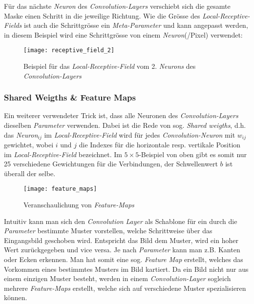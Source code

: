 Für das nächste \textit{Neuron} des \textit{Convolution-Layers} verschiebt sich die gesamte Maske einen Schritt in die jeweilige Richtung. Wie die Grösse des \textit{Local-Receptive-Fields} ist auch die Schrittgrösse ein \textit{Meta-Parameter} und kann angepasst werden, in diesem Beispiel wird eine Schrittgrösse von einem \textit{Neuron}(/Pixel) verwendet:

\begin{figure}[h]
	\ContinuedFloat
	\centering
	\texttt{[image: receptive\_field\_2]}
	\caption[Beispiel für das \textit{Local-Receptive-Field} 2. \textit{Neuron}]{Beispiel für das \textit{Local-Receptive-Field} vom 2. \textit{Neurons} des \textit{Convolution-Layers}}
	\label{img:rec_field2}
\end{figure}

\subsubsection{Shared Weigths \& Feature Maps} \label{cha:theo:cnn:fm}
Ein weiterer verwendeter Trick ist, dass alle Neuronen des \textit{Convolution-Layers} dieselben \textit{Parameter} verwenden. Dabei ist die Rede von sog. \textit{Shared weigths}, d.h. das \textit{Neuron}$_{ij}$ im \textit{Local-Receptive-Field} wird für jedes \textit{Convolution-Neuron} mit $w_{ij}$ gewichtet, wobei $i$ und $j$ die Indexes für die horizontale resp. vertikale Position im \textit{Local-Receptive-Field} bezeichnet. Im $5\times 5$-Beispiel von oben gibt es somit nur 25 verschiedene Gewichtungen für die Verbindungen, der Schwellenwert $b$ ist überall der selbe.

\begin{figure}[h]
	\centering
	\texttt{[image: feature\_maps]}
	\caption[\textit{Feature-Maps}]{Veranschaulichung von \textit{Feature-Maps}}
	\label{img:feature_maps}
\end{figure}

Intuitiv kann man sich den \textit{Convolution Layer} als Schablone für ein durch die \textit{Parameter} bestimmte Muster vorstellen, welche Schrittweise über das Eingangsbild geschoben wird. Entspricht das Bild dem Muster, wird ein hoher Wert zurückgegeben und vice versa. Je nach \textit{Parameter} kann man z.B. Kanten oder Ecken erkennen. Man hat somit eine sog. \textit{Feature Map} erstellt, welches das Vorkommen eines bestimmtes Musters im Bild kartiert. Da ein Bild nicht nur aus einem einzigen Muster besteht, werden in einem \textit{Convolution-Layer} sogleich mehrere \textit{Feature-Maps} erstellt, welche sich auf verschiedene Muster spezialisieren können.

